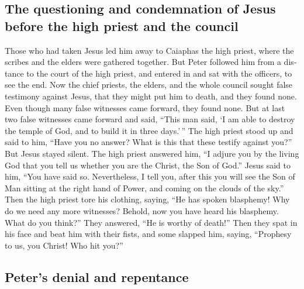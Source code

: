 \begin{paracol}{2}
\begin{otherlanguage}{english}
\hypertarget{the-questioning-and-condemnation-of-jesus-before-the-high-priest-and-the-council}{%
\subsection{The questioning and condemnation of Jesus before the high
priest and the
council}\label{the-questioning-and-condemnation-of-jesus-before-the-high-priest-and-the-council}}

 Those who had taken Jesus led him away to Caiaphas the
high priest, where the scribes and the elders were gathered together.
 But Peter followed him from a distance to the court of
the high priest, and entered in and sat with the officers, to see the
end.  Now the chief priests, the elders, and the whole
council sought false testimony against Jesus, that they might put him to
death,  and they found none. Even though many false
witnesses came forward, they found none. But at last two false witnesses
came forward  and said, ``This man said, `I am able to
destroy the temple of God, and to build it in three days.'\,''
 The high priest stood up and said to him, ``Have you no
answer? What is this that these testify against you?'' 
But Jesus stayed silent. The high priest answered him, ``I adjure you by
the living God that you tell us whether you are the Christ, the Son of
God.''  Jesus said to him, ``You have said so.
Nevertheless, I tell you, after this you will see the Son of Man sitting
at the right hand of Power, and coming on the clouds of the sky.''
 Then the high priest tore his clothing, saying, ``He has
spoken blasphemy! Why do we need any more witnesses? Behold, now you
have heard his blasphemy.  What do you think?'' They
answered, ``He is worthy of death!''  Then they spat in
his face and beat him with their fists, and some slapped him,
 saying, ``Prophesy to us, you Christ! Who hit you?''

\hypertarget{peters-denial-and-repentance}{%
\subsection{Peter's denial and
repentance}\label{peters-denial-and-repentance}}


\end{otherlanguage}
\end{paracol}
